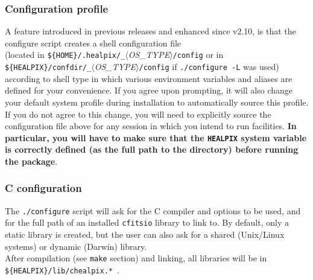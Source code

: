 \documentclass[12pt,twoside]{article}
\begin{document}
\subsubsection{Configuration profile}
\label{subsub:conf}
A feature introduced in previous releases and enhanced since v2.10, is that 
the configure script creates a shell configuration file \hfill\\
(located in
{\tt \$\{HOME\}/.healpix/\hpxverstex\_}{\em $\langle$OS\_TYPE$\rangle$}{\tt /config}
or in
\hfill\\
{\tt \$\{HEALPIX\}/confdir/\hpxverstex\_}{\em $\langle$OS\_TYPE$\rangle$}{\tt /config}
if {\tt ./configure -L} was used)
according to shell
type in which various environment variables and aliases are defined
for your convenience. If you agree upon prompting, it will also
change your default system profile during installation to
automatically source this profile. If you do not agree to this change,
you will need to explicitly source the configuration file above for any session in
which you intend to run \healpix facilities. {\bf In particular, you will
have to make sure that the {\tt HEALPIX} system variable is correctly
defined (as the full path to the \healpix directory) before running
the package}.


\subsubsection{C configuration}

The {\tt ./configure} script will ask for the C compiler and options to
be used, and for the full path of an installed {\tt cfitsio} library to link to.
By default, only a static library is created, but the user can also ask for
 a shared (Unix/Linux systems) or dynamic (Darwin) library. \\
After compilation
(see {\tt make} section) and linking, all libraries will be 
in {\tt \$\{HEALPIX\}/lib/chealpix.*}\ .
\end{document}
